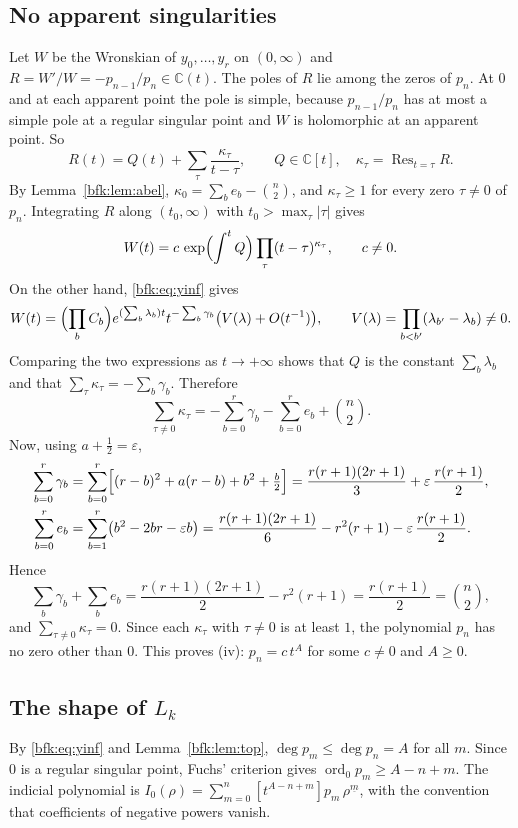 \documentclass[11pt,a4paper]{article}
\theoremstyle{definition}
\theoremstyle{remark}
\numberwithin{equation}{section}
\newcommand{\C}{\mathbb{C}}
\newcommand{\ff}[2]{#1^{\underline{#2}}}
\DeclareMathOperator{\ord}{ord}
\DeclareMathOperator{\Res}{Res}
\begin{document}
\subsection{No apparent singularities}
Let $W$ be the Wronskian of $y_0,\dots,y_r$ on $(0,\infty)$ and $R=W'/W=-p_{n-1}/p_n\in\C(t)$. The poles of $R$ lie among the zeros of $p_n$. At $0$ and at each apparent point the pole is simple, because $p_{n-1}/p_n$ has at most a simple pole at a regular singular point and $W$ is holomorphic at an apparent point. So
\[
R(t)=Q(t)+\sum_{\tau}\frac{\kappa_\tau}{t-\tau},\qquad Q\in\C[t],\quad \kappa_\tau=\Res_{t=\tau}R .
\]
By Lemma~\ref{bfk:lem:abel}, $\kappa_0=\sum_be_b-\binom n2$, and $\kappa_\tau\ge1$ for every zero $\tau\ne0$ of $p_n$. Integrating $R$ along $(t_0,\infty)$ with $t_0>\max_\tau|\tau|$ gives
\[
W(t)=c\,\exp\Bigl(\int^tQ\Bigr)\prod_\tau(t-\tau)^{\kappa_\tau},\qquad c\ne0 .
\]
On the other hand, \eqref{bfk:eq:yinf} gives
\[
W(t)=\Bigl(\prod_bC_b\Bigr)e^{(\sum_b\lambda_b)t}t^{-\sum_b\gamma_b}\bigl(V(\lambda)+O(t^{-1})\bigr),\qquad V(\lambda)=\prod_{b<b'}(\lambda_{b'}-\lambda_b)\ne0 .
\]
Comparing the two expressions as $t\to+\infty$ shows that $Q$ is the constant $\sum_b\lambda_b$ and that $\sum_\tau\kappa_\tau=-\sum_b\gamma_b$. Therefore
\[
\sum_{\tau\ne0}\kappa_\tau=-\sum_{b=0}^r\gamma_b-\sum_{b=0}^re_b+\binom n2 .
\]
Now, using $a+\frac12=\varepsilon$,
\begin{align*}
\sum_{b=0}^r\gamma_b&=\sum_{b=0}^r\Bigl[(r-b)^2+a(r-b)+b^2+\tfrac b2\Bigr]=\frac{r(r+1)(2r+1)}3+\varepsilon\,\frac{r(r+1)}2,\\
\sum_{b=0}^re_b&=\sum_{b=1}^r\bigl(b^2-2br-\varepsilon b\bigr)=\frac{r(r+1)(2r+1)}6-r^2(r+1)-\varepsilon\,\frac{r(r+1)}2 .
\end{align*}
Hence
\[
\sum_b\gamma_b+\sum_be_b=\frac{r(r+1)(2r+1)}2-r^2(r+1)=\frac{r(r+1)}2=\binom n2,
\]
and $\sum_{\tau\ne0}\kappa_\tau=0$. Since each $\kappa_\tau$ with $\tau\ne0$ is at least $1$, the polynomial $p_n$ has no zero other than $0$. This proves (iv): $p_n=c\,t^{A}$ for some $c\ne0$ and $A\ge0$.

\subsection{The shape of \texorpdfstring{$L_k$}{L\_k}}
By \eqref{bfk:eq:yinf} and Lemma~\ref{bfk:lem:top}, $\deg p_m\le\deg p_n=A$ for all $m$. Since $0$ is a regular singular point, Fuchs' criterion gives $\ord_0p_m\ge A-n+m$. The indicial polynomial is $I_0(\rho)=\sum_{m=0}^n[t^{A-n+m}]p_m\,\ff\rho m$, with the convention that coefficients of negative powers vanish.
\end{document}
